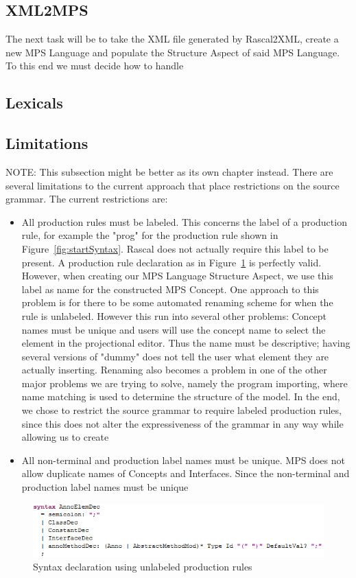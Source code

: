 \documentclass[a4paper, 11pt]{article}
\begin{document}
\subsection{XML2MPS}
The next task will be to take the XML file generated by Rascal2XML, create a new MPS Language and populate the Structure Aspect of said MPS Language. To this end we must decide how to handle  
\subsection{Lexicals}
\subsection{Limitations}
NOTE: This subsection might be better as its own chapter instead.
There are several limitations to the current approach that place restrictions on the source grammar. 
The current restrictions are:

\begin{itemize}
	\item All production rules must be labeled. This concerns the label of a production rule, for example the "prog" for the production rule shown in Figure~\ref{fig:startSyntax}. Rascal does not actually require this label to be present. A production rule declaration as in Figure~\ref{fig:UL} is perfectly valid. However, when creating our MPS Language Structure Aspect, we use this label as name for the constructed MPS Concept. One approach to this problem is for there to be some automated renaming scheme for when the rule is unlabeled. However this run into several other problems: Concept names must be unique and users will use the concept name to select the element in the projectional editor. Thus the name must be descriptive; having several versions of "dummy" does not tell the user what element they are actually inserting. Renaming also becomes a problem in one of the other major problems we are trying to solve, namely the program importing, where name matching is used to determine the structure of the model. In the end, we chose to restrict the source grammar to require labeled production rules, since this does not alter the expressiveness of the grammar in any way while allowing us to create 
	\item All non-terminal and production label names must be unique. MPS does not allow duplicate names of Concepts and Interfaces. Since the non-terminal and production label names must be unique 
	
\end{itemize}

\begin{figure}[h]
	\centering
	\includegraphics[width=\textwidth]{images/UnlabeledProduction.png}
	\caption{Syntax declaration using unlabeled production rules}
	\label{fig:UL}
\end{figure}
\end{document}
